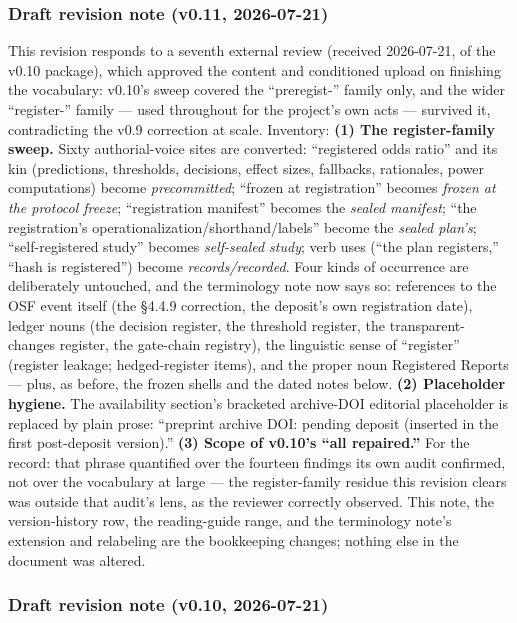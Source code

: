 \subsubsection{Draft revision note (v0.11, 2026-07-21)}\label{draft-revision-note-v0.11-2026-07-21}

This revision responds to a seventh external review (received 2026-07-21, of the v0.10 package), which approved the content and conditioned upload on finishing the vocabulary: v0.10's sweep covered the ``preregist-'' family only, and the wider ``register-'' family --- used throughout for the project's own acts --- survived it, contradicting the v0.9 correction at scale. Inventory: \textbf{(1) The register-family sweep.} Sixty authorial-voice sites are converted: ``registered odds ratio'' and its kin (predictions, thresholds, decisions, effect sizes, fallbacks, rationales, power computations) become \emph{precommitted}; ``frozen at registration'' becomes \emph{frozen at the protocol freeze}; ``registration manifest'' becomes the \emph{sealed manifest}; ``the registration's operationalization/shorthand/labels'' become the \emph{sealed plan's}; ``self-registered study'' becomes \emph{self-sealed study}; verb uses (``the plan registers,'' ``hash is registered'') become \emph{records/recorded}. Four kinds of occurrence are deliberately untouched, and the terminology note now says so: references to the OSF event itself (the \S{}4.4.9 correction, the deposit's own registration date), ledger nouns (the decision register, the threshold register, the transparent-changes register, the gate-chain registry), the linguistic sense of ``register'' (register leakage; hedged-register items), and the proper noun Registered Reports --- plus, as before, the frozen shells and the dated notes below. \textbf{(2) Placeholder hygiene.} The availability section's bracketed archive-DOI editorial placeholder is replaced by plain prose: ``preprint archive DOI: pending deposit (inserted in the first post-deposit version).'' \textbf{(3) Scope of v0.10's ``all repaired.''} For the record: that phrase quantified over the fourteen findings its own audit confirmed, not over the vocabulary at large --- the register-family residue this revision clears was outside that audit's lens, as the reviewer correctly observed. This note, the version-history row, the reading-guide range, and the terminology note's extension and relabeling are the bookkeeping changes; nothing else in the document was altered.

\subsubsection{Draft revision note (v0.10, 2026-07-21)}\label{draft-revision-note-v0.10-2026-07-21}

